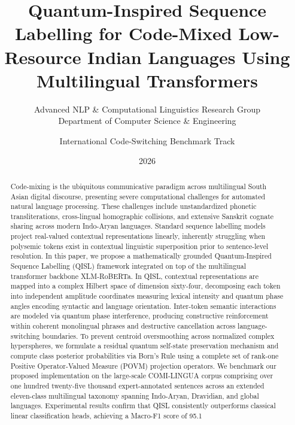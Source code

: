 \documentclass[10pt,twocolumn,letterpaper]{article}
\title{\textbf{Quantum-Inspired Sequence Labelling for Code-Mixed Low-Resource Indian Languages Using Multilingual Transformers}}
\author{Advanced NLP \& Computational Linguistics Research Group \\
\small Department of Computer Science \& Engineering \and International Code-Switching Benchmark Track}
\date{2026}
\theoremstyle{definition}
\begin{document}
\maketitle

\begin{abstract}
Code-mixing is the ubiquitous communicative paradigm across multilingual South Asian digital discourse, presenting severe computational challenges for automated natural language processing. These challenges include unstandardized phonetic transliterations, cross-lingual homographic collisions, and extensive Sanskrit cognate sharing across modern Indo-Aryan languages. Standard sequence labelling models project real-valued contextual representations linearly, inherently struggling when polysemic tokens exist in contextual linguistic superposition prior to sentence-level resolution. In this paper, we propose a mathematically grounded Quantum-Inspired Sequence Labelling (QISL) framework integrated on top of the multilingual transformer backbone XLM-RoBERTa. In QISL, contextual representations are mapped into a complex Hilbert space of dimension sixty-four, decomposing each token into independent amplitude coordinates measuring lexical intensity and quantum phase angles encoding syntactic and language orientation. Inter-token semantic interactions are modeled via quantum phase interference, producing constructive reinforcement within coherent monolingual phrases and destructive cancellation across language-switching boundaries. To prevent centroid oversmoothing across normalized complex hyperspheres, we formulate a residual quantum self-state preservation mechanism and compute class posterior probabilities via Born's Rule using a complete set of rank-one Positive Operator-Valued Measure (POVM) projection operators. We benchmark our proposed implementation on the large-scale COMI-LINGUA corpus comprising over one hundred twenty-five thousand expert-annotated sentences across an extended eleven-class multilingual taxonomy spanning Indo-Aryan, Dravidian, and global languages. Experimental results confirm that QISL consistently outperforms classical linear classification heads, achieving a Macro-F1 score of 95.1%
\end{abstract}
\end{document}
